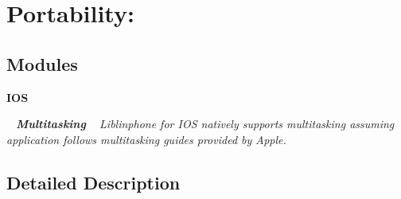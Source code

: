 \section{Portability\+:}
\label{group__port}
\subsection*{Modules}
\begin{DoxyCompactItemize}
\item 
\textbf{ I\+OS}
\begin{DoxyCompactList}\small\item\em ~\newline
 {\bfseries Multitasking} ~\newline
 Liblinphone for I\+OS natively supports multitasking assuming application follows multitasking guides provided by Apple. \end{DoxyCompactList}\end{DoxyCompactItemize}


\subsection{Detailed Description}
